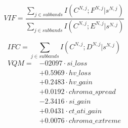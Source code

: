 \begin{equation}
VIF = \frac{\sum_{j\in subbands}{I(C^{N,j}; F^{N,j}|s^{N,j})}}{\sum_{j\in subbands}{I(C^{N,j}; E^{N,j}|s^{N,j})}}
\end{equation}

\begin{equation}
IFC = \sum_{j\in subbands}{I(C^{N,j}; D^{N,j}|s^{N,j})}
\end{equation}
\begin{equation}
\begin{split}
VQM = & -02097\cdot si\_loss\\
& +0.5969\cdot hv\_loss\\
& +0.2483\cdot hv\_gain\\ 
& +0.0192\cdot chroma\_spread\\
& -2.3416\cdot si\_gain\\
& +0.0431\cdot ct\_ati\_gain\\
& +0.0076\cdot chroma\_extreme
\end{split}
\end{equation}